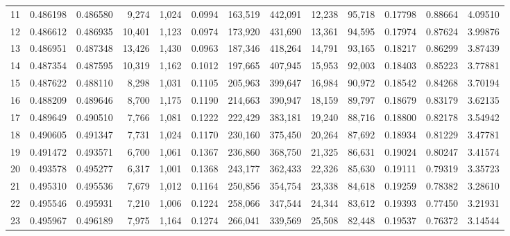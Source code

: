 \begin{tabular}{rrrrrrrrrrrrr}
11 &  0.486198 &  0.486580 &   9,274 &  1,024 &                                     0.0994 &  163,519 &  442,091 &   12,238 &   95,718 &  0.17798 &  0.88664 &  4.09510 \\
12 &  0.486612 &  0.486935 &  10,401 &  1,123 &                                     0.0974 &  173,920 &  431,690 &   13,361 &   94,595 &  0.17974 &  0.87624 &  3.99876 \\
13 &  0.486951 &  0.487348 &  13,426 &  1,430 &                                     0.0963 &  187,346 &  418,264 &   14,791 &   93,165 &  0.18217 &  0.86299 &  3.87439 \\
14 &  0.487354 &  0.487595 &  10,319 &  1,162 &                                     0.1012 &  197,665 &  407,945 &   15,953 &   92,003 &  0.18403 &  0.85223 &  3.77881 \\
15 &  0.487622 &  0.488110 &   8,298 &  1,031 &                                     0.1105 &  205,963 &  399,647 &   16,984 &   90,972 &  0.18542 &  0.84268 &  3.70194 \\
16 &  0.488209 &  0.489646 &   8,700 &  1,175 &                                     0.1190 &  214,663 &  390,947 &   18,159 &   89,797 &  0.18679 &  0.83179 &  3.62135 \\
17 &  0.489649 &  0.490510 &   7,766 &  1,081 &                                     0.1222 &  222,429 &  383,181 &   19,240 &   88,716 &  0.18800 &  0.82178 &  3.54942 \\
18 &  0.490605 &  0.491347 &   7,731 &  1,024 &                                     0.1170 &  230,160 &  375,450 &   20,264 &   87,692 &  0.18934 &  0.81229 &  3.47781 \\
19 &  0.491472 &  0.493571 &   6,700 &  1,061 &                                     0.1367 &  236,860 &  368,750 &   21,325 &   86,631 &  0.19024 &  0.80247 &  3.41574 \\
20 &  0.493578 &  0.495277 &   6,317 &  1,001 &                                     0.1368 &  243,177 &  362,433 &   22,326 &   85,630 &  0.19111 &  0.79319 &  3.35723 \\
21 &  0.495310 &  0.495536 &   7,679 &  1,012 &                                     0.1164 &  250,856 &  354,754 &   23,338 &   84,618 &  0.19259 &  0.78382 &  3.28610 \\
22 &  0.495546 &  0.495931 &   7,210 &  1,006 &                                     0.1224 &  258,066 &  347,544 &   24,344 &   83,612 &  0.19393 &  0.77450 &  3.21931 \\
23 &  0.495967 &  0.496189 &   7,975 &  1,164 &                                     0.1274 &  266,041 &  339,569 &   25,508 &   82,448 &  0.19537 &  0.76372 &  3.14544 \\

\end{tabular}
